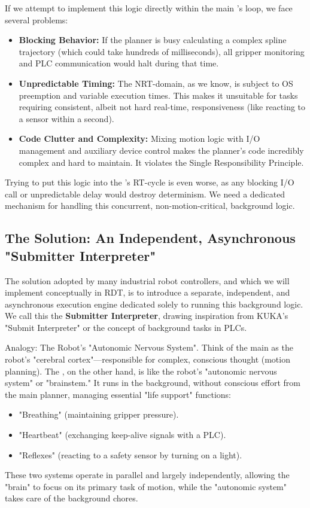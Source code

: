 If we attempt to implement this logic directly within the main 's loop, we face several problems:
\begin{itemize}
    \item \textbf{Blocking Behavior:} If the planner is busy calculating a complex spline trajectory (which could take hundreds of milliseconds), all gripper monitoring and PLC communication would halt during that time.
    \item \textbf{Unpredictable Timing:} The NRT-domain, as we know, is subject to OS preemption and variable execution times. This makes it unsuitable for tasks requiring consistent, albeit not hard real-time, responsiveness (like reacting to a sensor within a second).
    \item \textbf{Code Clutter and Complexity:} Mixing motion logic with I/O management and auxiliary device control makes the planner's code incredibly complex and hard to maintain. It violates the Single Responsibility Principle.
\end{itemize}
Trying to put this logic into the 's RT-cycle is even worse, as any blocking I/O call or unpredictable delay would destroy determinism. We need a dedicated mechanism for handling this concurrent, non-motion-critical, background logic.


\subsection{The Solution: An Independent, Asynchronous "Submitter Interpreter"}
\label{subsec:submitter_solution}

The solution adopted by many industrial robot controllers, and which we will implement conceptually in RDT, is to introduce a separate, independent, and asynchronous execution engine dedicated solely to running this background logic. We call this the \textbf{Submitter Interpreter}, drawing inspiration from KUKA's "Submit Interpreter" or the concept of background tasks in PLCs.

\begin{tipbox}{Analogy: The Robot's "Autonomic Nervous System".}
    Think of the main  as the robot's "cerebral cortex"—responsible for complex, conscious thought (motion planning). The , on the other hand, is like the robot's "autonomic nervous system" or "brainstem." It runs in the background, without conscious effort from the main planner, managing essential "life support" functions:
    \begin{itemize}
        \item "Breathing" (maintaining gripper pressure).
        \item "Heartbeat" (exchanging keep-alive signals with a PLC).
        \item "Reflexes" (reacting to a safety sensor by turning on a light).
    \end{itemize}
    These two systems operate in parallel and largely independently, allowing the "brain" to focus on its primary task of motion, while the "autonomic system" takes care of the background chores.
\end{tipbox}

